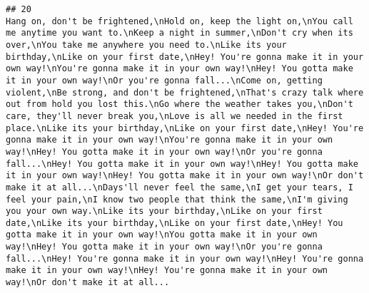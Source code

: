 \documentclass[]{article}
\begin{document}
\begin{verbatim}
## 20                                                                                                                                                                                                                                                                                                                                                                                                                                                                                                                                                                                                                                                                                                                                                                                                                                                                                                                                                                                                                                                                                                                                                                                                                                                                                                                                                                                                                                                                                                                                                                           Hang on, don't be frightened,\nHold on, keep the light on,\nYou call me anytime you want to.\nKeep a night in summer,\nDon't cry when its over,\nYou take me anywhere you need to.\nLike its your birthday,\nLike on your first date,\nHey! You're gonna make it in your own way!\nYou're gonna make it in your own way!\nHey! You gotta make it in your own way!\nOr you're gonna fall...\nCome on, getting violent,\nBe strong, and don't be frightened,\nThat's crazy talk where out from hold you lost this.\nGo where the weather takes you,\nDon't care, they'll never break you,\nLove is all we needed in the first place.\nLike its your birthday,\nLike on your first date,\nHey! You're gonna make it in your own way!\nYou're gonna make it in your own way!\nHey! You gotta make it in your own way!\nOr you're gonna fall...\nHey! You gotta make it in your own way!\nHey! You gotta make it in your own way!\nHey! You gotta make it in your own way!\nOr don't make it at all...\nDays'll never feel the same,\nI get your tears, I feel your pain,\nI know two people that think the same,\nI'm giving you your own way.\nLike its your birthday,\nLike on your first date,\nLike its your birthday,\nLike on your first date,\nHey! You gotta make it in your own way!\nYou gotta make it in your own way!\nHey! You gotta make it in your own way!\nOr you're gonna fall...\nHey! You're gonna make it in your own way!\nHey! You're gonna make it in your own way!\nHey! You're gonna make it in your own way!\nOr don't make it at all...

\end{verbatim}
\end{document}
